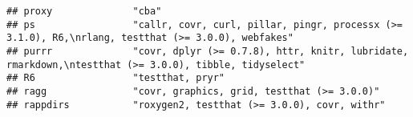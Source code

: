 \documentclass[
]{article}
\begin{document}
\begin{verbatim}
## proxy              "cba"                                                                                                                                                                                                                                                                                                                                                                                                                                                                             
## ps                 "callr, covr, curl, pillar, pingr, processx (>= 3.1.0), R6,\nrlang, testthat (>= 3.0.0), webfakes"                                                                                                                                                                                                                                                                                                                                                                                
## purrr              "covr, dplyr (>= 0.7.8), httr, knitr, lubridate, rmarkdown,\ntestthat (>= 3.0.0), tibble, tidyselect"                                                                                                                                                                                                                                                                                                                                                                             
## R6                 "testthat, pryr"                                                                                                                                                                                                                                                                                                                                                                                                                                                                  
## ragg               "covr, graphics, grid, testthat (>= 3.0.0)"                                                                                                                                                                                                                                                                                                                                                                                                                                       
## rappdirs           "roxygen2, testthat (>= 3.0.0), covr, withr"                                                                                                                                                                                                                                                                                                                                                                                                                                      

\end{verbatim}
\end{document}
